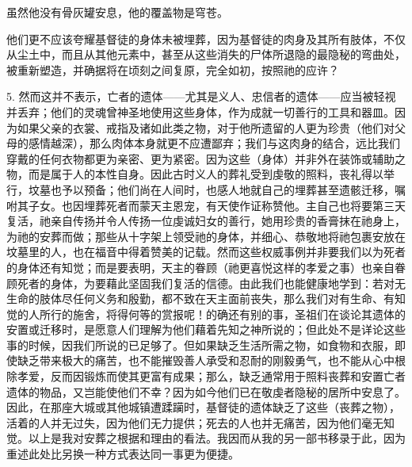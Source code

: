 虽然他没有骨灰罐安息，\newline{}他的覆盖物是穹苍。\par

他们更不应该夸耀基督徒的身体未被埋葬，因为基督徒的肉身及其所有肢体，不仅从尘土中，而且从其他元素中，甚至从这些消失的尸体所退隐的最隐秘的弯曲处，被重新塑造，并确据将在顷刻之间复原，完全如初，按照祂的应许？\par

5. 然而这并不表示，亡者的遗体——尤其是义人、忠信者的遗体——应当被轻视并丢弃；他们的灵魂曾神圣地使用这些身体，作为成就一切善行的工具和器皿。因为如果父亲的衣裳、戒指及诸如此类之物，对于他所遗留的人更为珍贵（他们对父母的感情越深），那么肉体本身就更不应遭鄙弃；我们与这肉身的结合，远比我们穿戴的任何衣物都更为亲密、更为紧密。因为这些（身体）并非外在装饰或辅助之物，而是属于人的本性自身。因此古时义人的葬礼受到虔敬的照料，丧礼得以举行，坟墓也予以预备；他们尚在人间时，也感人地就自己的埋葬甚至遗骸迁移，嘱咐其子女。也因埋葬死者而蒙天主恩宠，有天使作证称赞他。主自己也将要第三天复活，祂亲自传扬并令人传扬一位虔诚妇女的善行，她用珍贵的香膏抹在祂身上，为祂的安葬而做；那些从十字架上领受祂的身体，并细心、恭敬地将祂包裹安放在坟墓里的人，也在福音中得着赞美的记载。然而这些权威事例并非要我们以为死者的身体还有知觉；而是要表明，天主的眷顾（祂更喜悦这样的孝爱之事）也亲自眷顾死者的身体，为要藉此坚固我们复活的信德。由此我们也能健康地学到：若对无生命的肢体尽任何义务和殷勤，都不致在天主面前丧失，那么我们对有生命、有知觉的人所行的施舍，将得何等的赏报呢！的确还有别的事，圣祖们在谈论其遗体的安置或迁移时，是愿意人们理解为他们藉着先知之神所说的；但此处不是详论这些事的时候，因我们所说的已足够了。但如果缺乏生活所需之物，如食物和衣服，即使缺乏带来极大的痛苦，也不能摧毁善人承受和忍耐的刚毅勇气，也不能从心中根除孝爱，反而因锻炼而使其更富有成果；那么，缺乏通常用于照料丧葬和安置亡者遗体的物品，又岂能使他们不幸？因为如今他们已在敬虔者隐秘的居所中安息了。因此，在那座大城或其他城镇遭蹂躏时，基督徒的遗体缺乏了这些（丧葬之物），活着的人并无过失，因为他们无力提供；死去的人也并无痛苦，因为他们毫无知觉。以上是我对安葬之根据和理由的看法。我因而从我的另一部书移录于此，因为重述此处比另换一种方式表达同一事更为便捷。\par

